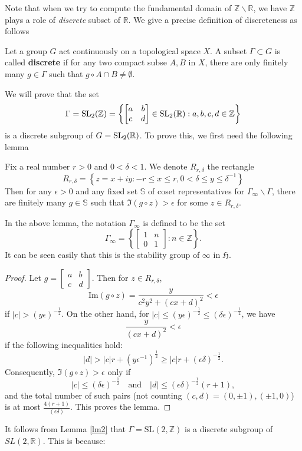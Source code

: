 Note that when we try to compute the fundamental domain of $\mathbb{Z}\backslash \mathbb{R}$, we have $\mathbb{Z}$ plays a role of
\textit{discrete} subset of $\mathbb{R}$. We give a precise definition of discreteness as follows
\begin{definition}
  Let a group $G$ act continuously on a topological space $X$. A subset $\Gamma \subset G$ is called \textbf{discrete} if for any two compact subse
  $A,B$ in $X$, there are only finitely many $g \in \Gamma$ such that $g \circ A \cap B \ne \emptyset$.
\end{definition}
We will prove that the set
\[\Gamma = \slz = \left\lbrace \begin{bmatrix}
    a & b \\
    c & d
  \end{bmatrix} \in \SL2: a, b, c, d \in \mathbb{Z}\right\rbrace\]
is a discrete subgroup of $G = \SL2$.
To prove this, we first need the following lemma
\begin{lemma}\label{lm2}
  Fix a real number $r>0$ and $0<\delta<1$. We denote $R_{r,\delta}$ the rectangle
  \[R_{r,\delta} = \left\lbrace z = x+iy: -r \le x \le r, 0 <\delta \le y \le \delta^{-1}\right\rbrace\]
  Then for any $\epsilon >0$ and any fixed set $\mathbb{S}$ of coset representatives for $\Gamma_\infty\backslash \Gamma$, there are finitely
  many $g \in \mathbb{S}$ such that $\Im(g\circ z)>\epsilon$ for some $z \in R_{r,\delta}$.
\end{lemma}
In the above lemma, the notation $\Gamma_\infty$ is defined to be the set
\[ \Gamma_\infty = \left\lbrace\begin{bmatrix}
    1 & n \\
    0 & 1
  \end{bmatrix}: n \in \mathbb{Z} \right\rbrace.\] It can be seen easily that this is the
stability group of $\infty$ in $\mathfrak{H}$.
\begin{proof}
  Let \( g = \begin{bmatrix} a & b \\ c & d \end{bmatrix} \). Then for \( z \in R_{r, \delta} \),
  \[
    \text{Im}(g \circ z) = \frac{y}{c^2 y^2 + (cx + d)^2} < \epsilon
  \]
  if \( |c| > (y \epsilon)^{-\frac{1}{2}} \). On the other hand, for \( |c| \leq (y \epsilon)^{-\frac{1}{2}} \leq (\delta \epsilon)^{-\frac{1}{2}} \), we have
  \[
    \frac{y}{(cx + d)^2} < \epsilon
  \]
  if the following inequalities hold:
  \[
    |d| > |c| r + (y \epsilon^{-1})^{\frac{1}{2}} \geq |c| r + (\epsilon \delta)^{-\frac{1}{2}}.
  \]
  Consequently, \(\Im(g \circ z) > \epsilon\) only if
  \[
    |c| \leq (\delta \epsilon)^{-\frac{1}{2}} \quad \text{and} \quad |d| \leq (\epsilon \delta)^{-\frac{1}{2}} (r + 1),
  \]
  and the total number of such pairs (not counting $(c, d) = (0, \pm 1), (\pm 1, 0)$) is at most $\frac{4(r+1)} {(\epsilon \delta)}$. This proves the lemma.
\end{proof}
It follows from Lemma \ref{lm2} that $\Gamma = \text{SL}(2, \mathbb{Z})$ is a discrete subgroup of $SL(2, \mathbb{R})$. This is because:

